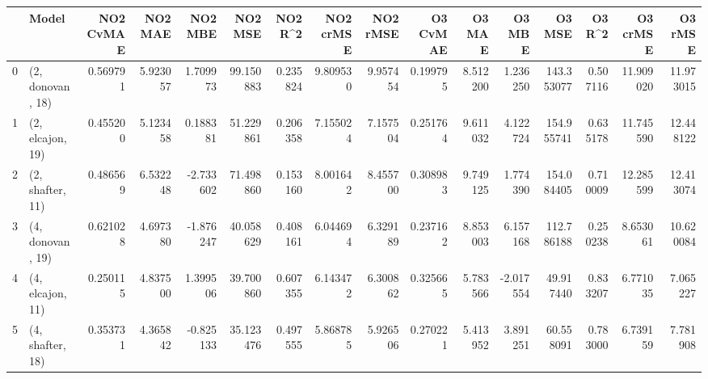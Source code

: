 \begin{tabular}{llrrrrrrrrrrrrrr}
\toprule
{} &             Model &  NO2 CvMAE &   NO2 MAE &   NO2 MBE &    NO2 MSE &   NO2 R\textasciicircum2 &  NO2 crMSE &  NO2 rMSE &  O3 CvMAE &    O3 MAE &    O3 MBE &      O3 MSE &    O3 R\textasciicircum2 &   O3 crMSE &    O3 rMSE \\
\midrule
0 &  (2, donovan, 18) &   0.569791 &  5.923057 &  1.709973 &  99.150883 &  0.235824 &   9.809530 &  9.957454 &  0.199795 &  8.512200 &  1.236250 &  143.353077 &  0.507116 &  11.909020 &  11.973015 \\
1 &  (2, elcajon, 19) &   0.455200 &  5.123458 &  0.188381 &  51.229861 &  0.206358 &   7.155024 &  7.157504 &  0.251764 &  9.611032 &  4.122724 &  154.955741 &  0.635178 &  11.745590 &  12.448122 \\
2 &  (2, shafter, 11) &   0.486569 &  6.532248 & -2.733602 &  71.498860 &  0.153160 &   8.001642 &  8.455700 &  0.308983 &  9.749125 &  1.774390 &  154.084405 &  0.710009 &  12.285599 &  12.413074 \\
3 &  (4, donovan, 19) &   0.621028 &  4.697380 & -1.876247 &  40.058629 &  0.408161 &   6.044694 &  6.329189 &  0.237162 &  8.853003 &  6.157168 &  112.786188 &  0.250238 &   8.653061 &  10.620084 \\
4 &  (4, elcajon, 11) &   0.250115 &  4.837500 &  1.399506 &  39.700860 &  0.607355 &   6.143472 &  6.300862 &  0.325665 &  5.783566 & -2.017554 &   49.917440 &  0.833207 &   6.771035 &   7.065227 \\
5 &  (4, shafter, 18) &   0.353731 &  4.365842 & -0.825133 &  35.123476 &  0.497555 &   5.868785 &  5.926506 &  0.270221 &  5.413952 &  3.891251 &   60.558091 &  0.783000 &   6.739159 &   7.781908 \\
\bottomrule
\end{tabular}
